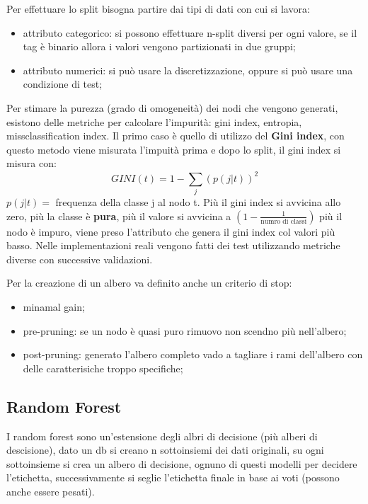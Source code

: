 \documentclass[12pt]{article}
\begin{document}
Per effettuare lo split bisogna partire dai tipi di dati con cui si lavora:
\begin{itemize}
    \item attributo categorico: si possono effettuare n-split diversi per ogni valore, se il tag \`e binario allora i valori vengono partizionati in due gruppi;
    \item attributo numerici: si pu\`o usare la discretizzazione, oppure si pu\`o usare una condizione di test;
\end{itemize}

Per stimare la purezza (grado di omogeneit\`a) dei nodi che vengono generati, esistono delle metriche per calcolare l'impurit\`a: gini index, entropia, missclassification index. Il primo caso \`e quello di utilizzo del \textbf{Gini index}, con questo metodo viene misurata l'impuit\`a prima e dopo lo split, il gini index si misura con:
\[ GINI(t) = 1 - \sum_{j}^{} (p(j|t))^{2} \]
$p(j|t) = $ frequenza della classe j al nodo t. Pi\`u il gini index si avvicina allo zero, pi\`u la classe \`e \textbf{pura}, pi\`u il valore si avvicina a $(1 - \frac{1}{\text{numro di classi}} )$ pi\`u il nodo \`e impuro, viene preso l'attributo che genera il gini index col valori pi\`u basso. Nelle implementazioni reali vengono fatti dei test utilizzando metriche diverse con successive validazioni.

Per la creazione di un albero va definito anche un criterio di stop:
\begin{itemize}
    \item minamal gain;
    \item pre-pruning: se un nodo \`e quasi puro rimuovo non scendno pi\`u nell'albero;
    \item post-pruning: generato l'albero completo vado a tagliare i rami dell'albero con delle caratterisiche troppo specifiche;
\end{itemize}



\subsection{Random Forest}
I random forest sono un'estensione degli albri di decisione (pi\`u alberi di descisione), dato un db si creano n sottoinsiemi dei dati originali, su ogni sottoinsieme si crea un albero di decisione, ognuno di questi modelli per decidere l'etichetta, successivamente si seglie l'etichetta finale in base ai voti (possono anche essere pesati).
\end{document}

